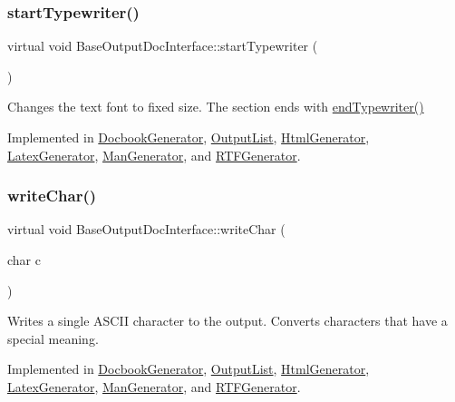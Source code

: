 \subsubsection{\texorpdfstring{startTypewriter()}{startTypewriter()}}
{\footnotesize\ttfamily virtual void Base\+Output\+Doc\+Interface\+::start\+Typewriter (\begin{DoxyParamCaption}{ }\end{DoxyParamCaption})\hspace{0.3cm}{\ttfamily [pure virtual]}}

Changes the text font to fixed size. The section ends with \mbox{\hyperlink{class_base_output_doc_interface_a9e987baf8aed76f0e5e6676b3238d2c8}{end\+Typewriter()}} 

Implemented in \mbox{\hyperlink{class_docbook_generator_a220738e28a4e2939e4da767f0ad33886}{Docbook\+Generator}}, \mbox{\hyperlink{class_output_list_a848e77a8fd7af578497f7ee1ec163b98}{Output\+List}}, \mbox{\hyperlink{class_html_generator_ae3174a7318289e8f7042f2d10345c419}{Html\+Generator}}, \mbox{\hyperlink{class_latex_generator_a72fe56f1f20836344b8fdf003c1a442e}{Latex\+Generator}}, \mbox{\hyperlink{class_man_generator_aa03f575a82549d2393bb080337769f1c}{Man\+Generator}}, and \mbox{\hyperlink{class_r_t_f_generator_ac3760aa18a5102cd8e8b0a4969f0953d}{R\+T\+F\+Generator}}.

\mbox{\label{class_base_output_doc_interface_a1577324720c1c71142dff84ae80b058d}} 
\subsubsection{\texorpdfstring{writeChar()}{writeChar()}}
{\footnotesize\ttfamily virtual void Base\+Output\+Doc\+Interface\+::write\+Char (\begin{DoxyParamCaption}\item[{char}]{c }\end{DoxyParamCaption})\hspace{0.3cm}{\ttfamily [pure virtual]}}

Writes a single A\+S\+C\+II character to the output. Converts characters that have a special meaning. 

Implemented in \mbox{\hyperlink{class_docbook_generator_ab075c899a62994272a1f542404ec614d}{Docbook\+Generator}}, \mbox{\hyperlink{class_output_list_a188c7a8f0a0dc35ec5ea0f8b4a491d33}{Output\+List}}, \mbox{\hyperlink{class_html_generator_a71e6263d7ffef2cc600e289be06c4f33}{Html\+Generator}}, \mbox{\hyperlink{class_latex_generator_a910e0329c0a8c8b54685d2335d22f690}{Latex\+Generator}}, \mbox{\hyperlink{class_man_generator_a5831577a90e226daf7ad892dd8744d33}{Man\+Generator}}, and \mbox{\hyperlink{class_r_t_f_generator_a1d1912d4a9d95b54ee88b12b3306e3d2}{R\+T\+F\+Generator}}.

